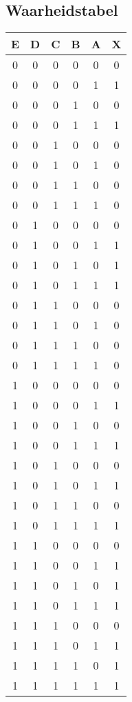 \documentclass[11pt, a4paper]{report}
\begin{document}
\subsection*{Waarheidstabel}

\begin{tabular}{| c c c c c | c |}
\hline
E & D & C & B & A & X \\
\hline
0 & 0 & 0 & 0 & 0 & 0 \\
0 & 0 & 0 & 0 & 1 & 1 \\
0 & 0 & 0 & 1 & 0 & 0 \\
0 & 0 & 0 & 1 & 1 & 1 \\
\hline
0 & 0 & 1 & 0 & 0 & 0 \\
0 & 0 & 1 & 0 & 1 & 0 \\
0 & 0 & 1 & 1 & 0 & 0 \\
0 & 0 & 1 & 1 & 1 & 0 \\
\hline
0 & 1 & 0 & 0 & 0 & 0 \\
0 & 1 & 0 & 0 & 1 & 1 \\
0 & 1 & 0 & 1 & 0 & 1 \\
0 & 1 & 0 & 1 & 1 & 1 \\
\hline
0 & 1 & 1 & 0 & 0 & 0 \\
0 & 1 & 1 & 0 & 1 & 0 \\
0 & 1 & 1 & 1 & 0 & 0 \\
0 & 1 & 1 & 1 & 1 & 0 \\
\hline
1 & 0 & 0 & 0 & 0 & 0 \\
1 & 0 & 0 & 0 & 1 & 1 \\
1 & 0 & 0 & 1 & 0 & 0 \\
1 & 0 & 0 & 1 & 1 & 1 \\
\hline
1 & 0 & 1 & 0 & 0 & 0 \\
1 & 0 & 1 & 0 & 1 & 1 \\
1 & 0 & 1 & 1 & 0 & 0 \\
1 & 0 & 1 & 1 & 1 & 1 \\
\hline
1 & 1 & 0 & 0 & 0 & 0 \\
1 & 1 & 0 & 0 & 1 & 1 \\
1 & 1 & 0 & 1 & 0 & 1 \\
1 & 1 & 0 & 1 & 1 & 1 \\
\hline
1 & 1 & 1 & 0 & 0 & 0 \\
1 & 1 & 1 & 0 & 1 & 1 \\
1 & 1 & 1 & 1 & 0 & 1 \\
1 & 1 & 1 & 1 & 1 & 1 \\
\hline
\end{tabular}
\end{document}
